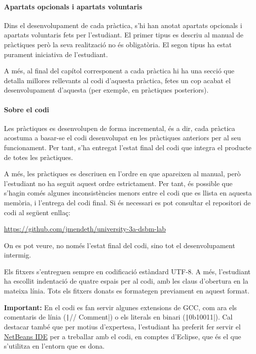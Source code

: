 \documentclass[catalan,parskip=half*,oneside,DIV=11,hidelinks]{scrreprt}
\begin{document}
\paragraph{Apartats opcionals i apartats voluntaris}

Dins el desenvolupament de cada pràctica, s'hi han anotat apartats opcionals i apartats voluntaris
fets per l'estudiant. El primer tipus es descriu al manual de pràctiques però la seva realització
no és obligatòria. El segon tipus ha estat purament iniciativa de l'estudiant.

A més, al final del capítol corresponent a cada pràctica hi ha una secció que detalla
millores rellevants al codi d'aquesta pràctica, fetes un cop acabat el desenvolupament d'aquesta
(per exemple, en pràctiques posteriors).

\paragraph{Sobre el codi}

Les pràctiques es desenvolupen de forma incremental, és a dir, cada pràctica acostuma a
basar-se el codi desenvolupat en les pràctiques anteriors per al seu funcionament. Per tant, s'ha
entregat l'estat final del codi que integra el producte de totes les pràctiques.

A més, les pràctiques es descriuen en l'ordre en que apareixen al manual, però l'estudiant no
ha seguit aquest ordre estrictament. Per tant, és possible que s'hagin comés algunes
inconsistències menors entre el codi que es llista en aquesta memòria, i l'entrega del
codi final. Si és necessari es pot consultar el repositori de codi al següent enllaç:

\url{https://github.com/jmendeth/university-3a-dsbm-lab}

On es pot veure, no només l'estat final del codi, sino tot el desenvolupament intermig.

Els fitxers s'entreguen sempre en codificació estàndard UTF-8.
A més, l'estudiant ha escollit indentació de quatre espais per al codi, amb les claus d'obertura
en la mateixa línia. Tots els fitxers donats es formategen previament en aquest format.

\textbf{Important:} En el codi es fan servir algunes extensions de GCC, com ara els
comentaris de línia (\texttt|// Comment|) o els literals en binari (\texttt|0b10011|).
Cal destacar també que per motius d'expertesa, l'estudiant ha preferit fer servir el
\href{http://netbeans.org}{NetBeans IDE} per a treballar amb el codi, en comptes d'Eclipse,
que és el que s'utilitza en l'entorn que es dona.
\end{document}
